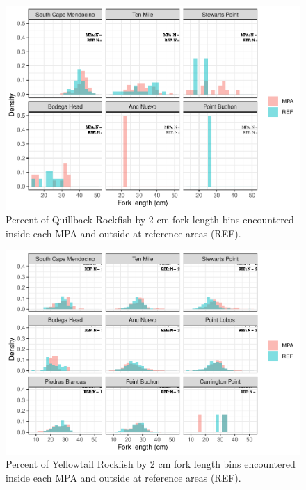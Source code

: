 \documentclass[
]{article}
\begin{document}
\begin{figure}
\centering
\includegraphics{CCRFP_available_data_for_assessments_files/figure-latex/fig-lengths-3.pdf}
\caption{\label{fig:fig-lengths-3}Percent of Quillback Rockfish by 2 cm fork length bins encountered inside each MPA and outside at reference areas (REF).}
\end{figure}

\begin{figure}
\centering
\includegraphics{CCRFP_available_data_for_assessments_files/figure-latex/fig-lengths-4.pdf}
\caption{\label{fig:fig-lengths-4}Percent of Yellowtail Rockfish by 2 cm fork length bins encountered inside each MPA and outside at reference areas (REF).}
\end{figure}

\FloatBarrier
\end{document}
